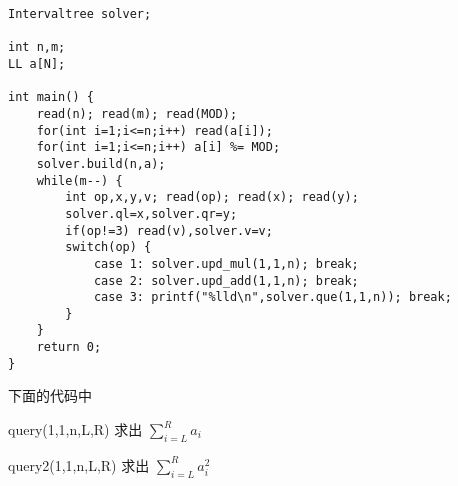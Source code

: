 \documentclass[UTF8]{ctexart}
\begin{document}
\begin{framed}
\begin{lstlisting}
Intervaltree solver;

int n,m;
LL a[N];

int main() {
    read(n); read(m); read(MOD);
    for(int i=1;i<=n;i++) read(a[i]);
    for(int i=1;i<=n;i++) a[i] %= MOD;
    solver.build(n,a);
    while(m--) {
        int op,x,y,v; read(op); read(x); read(y);
        solver.ql=x,solver.qr=y;
        if(op!=3) read(v),solver.v=v;
        switch(op) {
            case 1: solver.upd_mul(1,1,n); break;
            case 2: solver.upd_add(1,1,n); break;
            case 3: printf("%lld\n",solver.que(1,1,n)); break;
        }
    }
    return 0;
}
\end{lstlisting}
\end{framed}

下面的代码中 

query(1,1,n,L,R) 求出 $\sum_{i=L}^R a_i$

query2(1,1,n,L,R) 求出 $\sum_{i=L}^R a^2_i$
\end{document}
